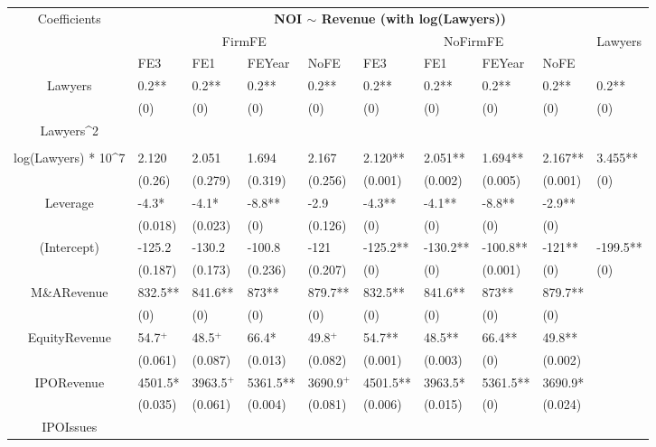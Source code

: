 \documentclass{article}
\begin{document}
\begin{table}[H]
\centering
\begin{tabular}{|clllllllll|}
\hline
\multirow{3}{*}{Coefficients} & \multicolumn{9}{c|}{\textbf{NOI $\sim$ Revenue (with log(Lawyers))}} \\
\cline{2-10}
& \multicolumn{4}{c}{FirmFE} & \multicolumn{4}{c}{NoFirmFE} & \multirow{2}{*}{Lawyers} \\
\cline{2-9}
& FE3 & FE1 & FEYear & NoFE & FE3 & FE1 & FEYear & NoFE &  \\
\hline
 
Lawyers & 0.2** & 0.2** & 0.2** & 0.2** & 0.2** & 0.2** & 0.2** & 0.2** & 0.2** \\ 
   & (0) & (0) & (0) & (0) & (0) & (0) & (0) & (0) & (0) \\ 
  Lawyers^2 &  &  &  &  &  &  &  &  &  \\ 
   &  &  &  &  &  &  &  &  &  \\ 
  log(Lawyers) * 10^7 & 2.120 & 2.051 & 1.694 & 2.167 & 2.120** & 2.051** & 1.694** & 2.167** & 3.455** \\ 
   & (0.26) & (0.279) & (0.319) & (0.256) & (0.001) & (0.002) & (0.005) & (0.001) & (0) \\ 
  Leverage & -4.3* & -4.1* & -8.8** & -2.9 & -4.3** & -4.1** & -8.8** & -2.9** &  \\ 
   & (0.018) & (0.023) & (0) & (0.126) & (0) & (0) & (0) & (0) &  \\ 
  (Intercept) & -125.2 & -130.2 & -100.8 & -121 & -125.2** & -130.2** & -100.8** & -121** & -199.5** \\ 
   & (0.187) & (0.173) & (0.236) & (0.207) & (0) & (0) & (0.001) & (0) & (0) \\ 
  M\&ARevenue & 832.5** & 841.6** & 873** & 879.7** & 832.5** & 841.6** & 873** & 879.7** &  \\ 
   & (0) & (0) & (0) & (0) & (0) & (0) & (0) & (0) &  \\ 
  EquityRevenue & 54.7$^{+}$ & 48.5$^{+}$ & 66.4* & 49.8$^{+}$ & 54.7** & 48.5** & 66.4** & 49.8** &  \\ 
   & (0.061) & (0.087) & (0.013) & (0.082) & (0.001) & (0.003) & (0) & (0.002) &  \\ 
  IPORevenue & 4501.5* & 3963.5$^{+}$ & 5361.5** & 3690.9$^{+}$ & 4501.5** & 3963.5* & 5361.5** & 3690.9* &  \\ 
   & (0.035) & (0.061) & (0.004) & (0.081) & (0.006) & (0.015) & (0) & (0.024) &  \\ 
  IPOIssues &  &  &  &  &  &  &  &  &  \\ 

\end{tabular}
\end{table}
\end{document}
